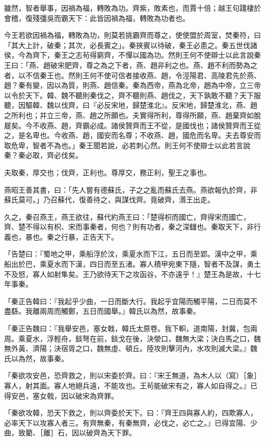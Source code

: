 \begin{pinyinscope}
雖然，智者舉事，因禍為福，轉敗為功。齊紫，敗素也，而賈十倍；越王句踐棲於會稽，復殘彊吳而霸天下：此皆因禍為福，轉敗為功者也。

今王若欲因禍為福，轉敗為功，則莫若挑霸齊而尊之，使使盟於周室，焚秦符，曰「其大上計，破秦；其次，必長賓之」。秦挾賓以待破，秦王必患之。秦五世伐諸侯，今為齊下，秦王之志茍得窮齊，不憚以國為功。然則王何不使辯士以此言說秦王曰：「燕、趙破宋肥齊，尊之為之下者，燕、趙非利之也。燕、趙不利而勢為之者，以不信秦王也。然則王何不使可信者接收燕、趙，令涇陽君、高陵君先於燕、趙？秦有變，因以為質，則燕、趙信秦。秦為西帝，燕為北帝，趙為中帝，立三帝以令於天下。韓、魏不聽則秦伐之，齊不聽則燕、趙伐之，天下孰敢不聽？天下服聽，因驅韓、魏以伐齊，曰『必反宋地，歸楚淮北』。反宋地，歸楚淮北，燕、趙之所利也；并立三帝，燕、趙之所願也。夫實得所利，尊得所願，燕、趙棄齊如脫屣矣。今不收燕、趙，齊霸必成。諸侯贊齊而王不從，是國伐也；諸侯贊齊而王從之，是名卑也。今收燕、趙，國安而名尊；不收燕、趙，國危而名卑。夫去尊安而取危卑，智者不為也。」秦王聞若說，必若刺心然。則王何不使辯士以此若言說秦？秦必取，齊必伐矣。

夫取秦，厚交也；伐齊，正利也。尊厚交，務正利，聖王之事也。

燕昭王善其書，曰：「先人嘗有德蘇氏，子之之亂而蘇氏去燕。燕欲報仇於齊，非蘇氏莫可。」乃召蘇代，復善待之，與謀伐齊。竟破齊，湣王出走。

久之，秦召燕王，燕王欲往，蘇代約燕王曰：「楚得枳而國亡，齊得宋而國亡，齊、楚不得以有枳、宋而事秦者，何也？則有功者，秦之深讎也。秦取天下，非行義也，暴也。秦之行暴，正告天下。

「告楚曰：『蜀地之甲，乘船浮於汶，乘夏水而下江，五日而至郢。漢中之甲，乘船出於巴，乘夏水而下漢，四日而至五渚。寡人積甲宛東下隨，智者不及謀，勇土不及怒，寡人如射隼矣。王乃欲待天下之攻函谷，不亦遠乎！』楚王為是故，十七年事秦。

「秦正告韓曰：『我起乎少曲，一日而斷大行。我起乎宜陽而觸平陽，二日而莫不盡繇。我離兩周而觸鄭，五日而國舉。』韓氏以為然，故事秦。

「秦正告魏曰：『我舉安邑，塞女戟，韓氏太原卷。我下軹，道南陽，封冀，包兩周。乘夏水，浮輕舟，錟弩在前，錟戈在後，決滎口，魏無大梁；決白馬之口，魏無外黃、濟陽；決宿胥之口，魏無虛、頓丘。陸攻則擊河內，水攻則滅大梁。』魏氏以為然，故事秦。

「秦欲攻安邑，恐齊救之，則以宋委於齊。曰：『宋王無道，為木人以（寫）［象］寡人，射其面。寡人地絕兵遠，不能攻也。王茍能破宋有之，寡人如自得之。』已得安邑，塞女戟，因以破宋為齊罪。

「秦欲攻韓，恐天下救之，則以齊委於天下。曰：『齊王四與寡人約，四欺寡人，必率天下以攻寡人者三。有齊無秦，有秦無齊，必伐之，必亡之。』已得宜陽、少曲，致藺、［離］石，因以破齊為天下罪。


\end{pinyinscope}
